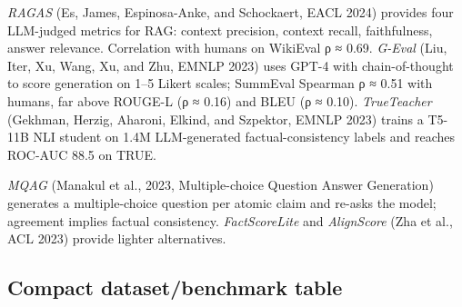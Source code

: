 \emph{RAGAS} (Es, James, Espinosa-Anke, and Schockaert, EACL 2024) provides four LLM-judged metrics for RAG: context precision, context recall, faithfulness, answer relevance. Correlation with humans on WikiEval ρ ≈ 0.69. \emph{G-Eval} (Liu, Iter, Xu, Wang, Xu, and Zhu, EMNLP 2023) uses GPT-4 with chain-of-thought to score generation on 1--5 Likert scales; SummEval Spearman ρ ≈ 0.51 with humans, far above ROUGE-L (ρ ≈ 0.16) and BLEU (ρ ≈ 0.10). \emph{TrueTeacher} (Gekhman, Herzig, Aharoni, Elkind, and Szpektor, EMNLP 2023) trains a T5-11B NLI student on 1.4M LLM-generated factual-consistency labels and reaches ROC-AUC 88.5 on TRUE.

\emph{MQAG} (Manakul et al., 2023, Multiple-choice Question Answer Generation) generates a multiple-choice question per atomic claim and re-asks the model; agreement implies factual consistency. \emph{FactScoreLite} and \emph{AlignScore} (Zha et al., ACL 2023) provide lighter alternatives.

\subsection{Compact dataset/benchmark table}\label{compact-datasetbenchmark-table}

